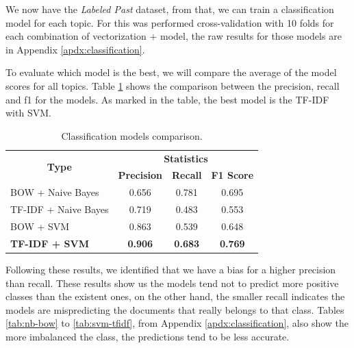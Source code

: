 
We now have the \textit{Labeled Past} dataset, from that, we can train a classification model for each topic. For this was performed cross-validation with 10 folds for each combination of vectorization + model, the raw results for those models are in Appendix \ref{apdx:classification}.


To evaluate which model is the best, we will compare the average of the model scores for all topics. Table \ref{tab:classification-report} shows the comparison between the precision, recall and f1 for the models.
As marked in the table, the best model is the TF-IDF with SVM.

\begin{table}[h!]
	\centering
	\caption{Classification models comparison.}
	\label{tab:classification-report}
	\begin{tabular}{c|ccc}
		\toprule
		\multirow{2}{*}{\textbf{Type}} & \multicolumn{3}{c}{\textbf{Statistics}} \\\cmidrule{2-4}
		 & \textbf{Precision} & \textbf{Recall} & \textbf{F1 Score} \\ \midrule
		\multicolumn{1}{l|}{BOW + Naive Bayes}     & 0.656 & 0.781 & 0.695 \\
		\multicolumn{1}{l|}{TF-IDF + Naive Bayes}  & 0.719 & 0.483 & 0.553 \\
		\multicolumn{1}{l|}{BOW + SVM}             & 0.863 & 0.539 & 0.648 \\
		\multicolumn{1}{l|}{\textbf{TF-IDF + SVM}} & \textbf{0.906} & \textbf{0.683} & \textbf{0.769} \\
		\bottomrule
	\end{tabular}
\end{table}

Following these results, we identified that we have a bias for a higher precision than recall. These results show us the models tend not to predict more positive classes than the existent ones, on the other hand, the smaller recall indicates the models are mispredicting the documents that really belongs to that class. Tables \ref{tab:nb-bow} to \ref{tab:svm-tfidf}, from Appendix \ref{apdx:classification}, also show the more imbalanced the class, the predictions tend to be less accurate.


